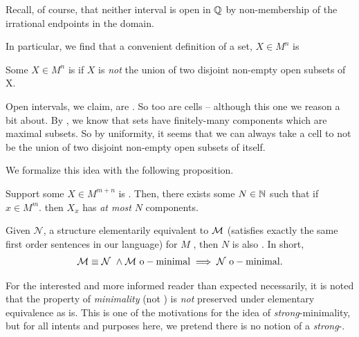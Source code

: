 \begin{svgraybox}
  Recall, of course, that neither interval is open in $\mathbb{Q}$ by non-membership of the irrational endpoints in the domain.
\end{svgraybox}

In particular, we find that a convenient definition of a  set, $X \in M^n$ is

\begin{definition}
  Some $X \in M^n$ is  if $X$ is \emph{not} the union of two disjoint non-empty  open subsets of X.
\end{definition}


\begin{example}
  Open intervals, we claim, are . So too are cells -- although this one we reason a bit about. By \CD, we know that  sets have finitely-many  components which are maximal  \cnctd subsets. So by uniformity, it seems that we can always take a cell to not be the union of two disjoint non-empty  open subsets of itself.

\end{example}

We formalize this idea with the following proposition.

\begin{proposition}
  \label{prop:dfnblycnctd}
  Support some $X \in M^{m + n}$ is . Then, there exists some $N \in \mathbb{N}$ such that if $x \in M^m$. then $X_x$ has \emph{at most} $N$  components.
\end{proposition}

\begin{corollary}
  Given $\mathcal{N}$, a structure elementarily equivalent to $\mathcal{M}$ (satisfies exactly the same first order sentences in our language) for $M$ \om, then $N$ is also \om. In short,
  \begin{align*}
    \mathcal{M} \equiv \mathcal{N} \ \wedge \mathcal{M} \ \mathrm{o-minimal} \implies \mathcal{N} \ \mathrm{o-minimal}.
  \end{align*}
\end{corollary}

\begin{svgraybox}
  For the interested and more informed reader than expected necessarily, it is noted that the property of \emph{minimality} (not \omy) is \emph{not} preserved under elementary equivalence as \omy is. This is one of the motivations for the idea of \emph{strong}-minimality, but for all intents and purposes here, we pretend there is no notion of a \emph{strong}-\omy.
\end{svgraybox}

